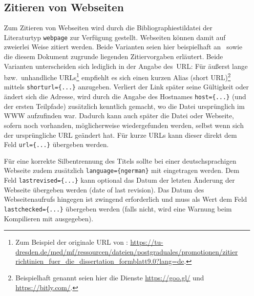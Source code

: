 \documentclass[a4paper,10pt]{scrartcl}
\renewcommand{\cite}{\citep}  %
\begin{document}
\subsection{Zitieren von Webseiten}
Zum Zitieren von Webseiten wird durch die Bibliographiestildatei
der Literaturtyp \verb|webpage| zur Verfügung gestellt. Webseiten können
damit auf zweierlei Weise zitiert werden. Beide Varianten seien hier
beispielhaft an~ sowie die diesem Dokument
zugrunde liegenden Zitiervorgaben
 erläutert. Beide Varianten unterscheiden sich
lediglich in der Angabe des~URL: Für äußerst lange bzw.\ unhandliche
URLs\footnote{Zum
Beispiel der originale URL von \cite{ZitiervorgabenCGC}: \url{
https://tu-dresden.de/med/mf/ressourcen/dateien/postgraduales/promotionen/zitier
richtinien_fuer_die_dissertation_formblatt9.0?lang=de}.} empfiehlt es sich
einen kurzen Alias (short URL)\footnote{Beispielhaft genannt seien hier die
Dienste \url{https://goo.gl/} und \url{https://bitly.com/}.} mittels
\verb|shorturl={...}| anzugeben. Verliert der Link später seine Gültigkeit oder
ändert sich die Adresse, wird durch die Angabe des Hostnames \verb|host={...}|
(und der ersten Teilpfade) zusätzlich kenntlich gemacht, wo die Datei
ursprünglich im WWW aufzufinden war. Dadurch kann auch später die Datei oder
Webseite, sofern noch vorhanden, möglicherweise wiedergefunden werden, selbst
wenn sich der ursprüngliche URL geändert hat. Für kurze URLs kann dieser direkt
dem Feld \verb|url={...}| übergeben werden.

Für eine korrekte Silbentrennung  des Titels sollte bei einer deutschsprachigen
Webseite zudem zusätzlich
\verb|language={ngerman}| mit eingetragen werden. Dem Feld
\verb|lastrevised={...}|
kann optional das Datum der letzten Änderung der Webseite übergeben werden
(date of last revision). Das Datum des Webseitenaufrufs hingegen ist zwingend
erforderlich und muss als Wert dem Feld
\verb|lastchecked={...}| übergeben werden (falls nicht, wird eine
Warnung beim Kompilieren mit  ausgegeben).
\end{document}
